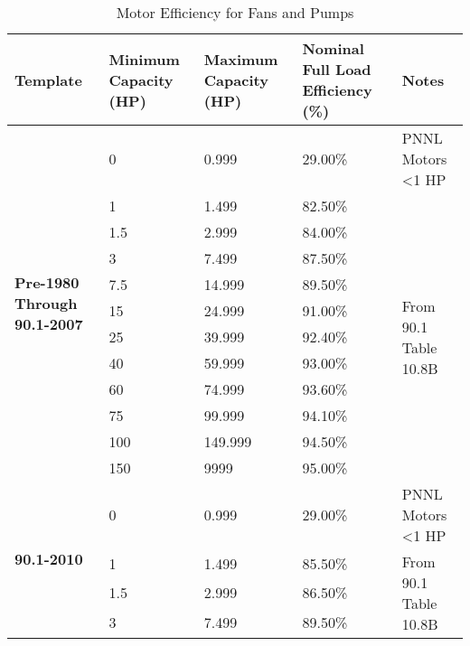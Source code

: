 \begin{table}[htbp]
\centering
\small
\caption{Motor Efficiency for Fans and Pumps}
\label{tab:fan_motor_efficiencies}
\begin{tabular}{|p{1.4cm}|p{1.5cm}|p{1.5cm}|p{1.5cm}|p{2cm}|}
\hline
\textbf{Template} &
  \textbf{Minimum Capacity (HP)} &
  \textbf{Maximum Capacity (HP)} &
  \textbf{Nominal Full Load Efficiency (\%)} &
  \textbf{Notes} \\ \hline
\multirow{12}{*}{\parbox{1.4cm}{\textbf{Pre-1980 Through 90.1-2007}}}
 & 0       & 0.999   & 29.00\% & PNNL Motors \textless 1 HP \\ \cline{2-4} \cline{5-5} 
 & 1       & 1.499   & 82.50\% & \multirow{11}{*}{\parbox{2cm}{From 90.1 Table 10.8B}}   \\ \cline{2-4}
 & 1.5     & 2.999   & 84.00\% &                                           \\ \cline{2-4}
 & 3       & 7.499   & 87.50\% &                                           \\ \cline{2-4}
 & 7.5     & 14.999  & 89.50\% &                                           \\ \cline{2-4}
 & 15      & 24.999  & 91.00\% &                                           \\ \cline{2-4}
 & 25      & 39.999  & 92.40\% &                                           \\ \cline{2-4}
 & 40      & 59.999  & 93.00\% &                                           \\ \cline{2-4}
 & 60      & 74.999  & 93.60\% &                                           \\ \cline{2-4}
 & 75      & 99.999  & 94.10\% &                                           \\ \cline{2-4}
 & 100     & 149.999 & 94.50\% &                                           \\ \cline{2-4}
 & 150     & 9999    & 95.00\% &                                           \\ \cline{1-4} \cline{5-5}
\multirow{14}{*}{\textbf{90.1-2010}}
 & 0       & 0.999   & 29.00\% & PNNL Motors \textless 1 HP                 \\ \cline{2-4} \cline{5-5} 
 & 1       & 1.499   & 85.50\% & \multirow{13}{*}{\parbox{2cm}{From 90.1 Table 10.8B}}   \\ \cline{2-4}
 & 1.5     & 2.999   & 86.50\% &                                           \\ \cline{2-4}
 & 3       & 7.499   & 89.50\% &                                           \\ \cline{2-4}

\end{tabular}
\end{table}
